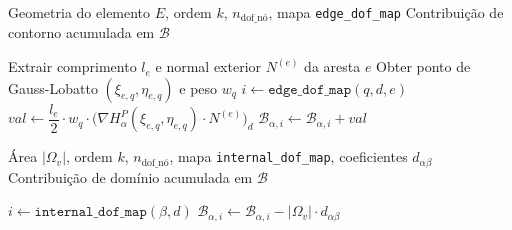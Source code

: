     \begin{algorithm}[H]
    \caption{Parcela de Contorno da Matriz $\mathcal{B}^{(\nabla)}$}
    \label{alg:compute_B_boundary}
    \begin{algorithmic}[1]
        \Require Geometria do elemento $E$, ordem $k$, $n_{\text{dof\_nó}}$, mapa \texttt{edge\_dof\_map}
        \Ensure Contribuição de contorno acumulada em $\mathcal{B}$

                \State Extrair comprimento $l_e$ e normal exterior $N^{(e)}$ da aresta $e$
                    \State Obter ponto de Gauss-Lobatto $(\xi_{e,q},\eta_{e,q})$ e peso $w_q$
                        \State $i \gets \texttt{edge\_dof\_map}(q,d,e)$ 
                                \State $val \gets \dfrac{l_e}{2}\cdot w_q\cdot\bigl(\nabla H_\alpha^P(\xi_{e,q},\eta_{e,q})\cdot N^{(e)}\bigr)_d$
                                \State $\mathcal{B}_{\alpha,i} \gets \mathcal{B}_{\alpha,i} + val$
                            \EndFor
                        \EndIf
                    \EndFor
                \EndFor
            \EndFor
        \EndFunction
    \end{algorithmic}
\end{algorithm}

\begin{algorithm}[H]
    \caption{Parcela de Domínio da Matriz $\mathcal{B}^{(\nabla)}$}
    \label{alg:compute_B_domain}
    \begin{algorithmic}[1]
        \Require Área $|\Omega_v|$, ordem $k$, $n_{\text{dof\_nó}}$, mapa \texttt{internal\_dof\_map}, coeficientes $d_{\alpha\beta}$
        \Ensure Contribuição de domínio acumulada em $\mathcal{B}$

                \State \Return
            \EndIf
                    \State $i \gets \texttt{internal\_dof\_map}(\beta,d)$ 
                            \State $\mathcal{B}_{\alpha,i} \gets \mathcal{B}_{\alpha,i} - |\Omega_v|\cdot d_{\alpha\beta}$
                        \EndFor
                    \EndIf
                \EndFor
            \EndFor
        \EndFunction
    \end{algorithmic}
\end{algorithm}

